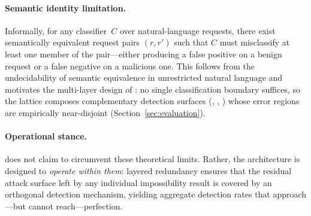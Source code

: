 \paragraph{Semantic identity limitation.}
Informally, for any classifier~$C$ over natural-language requests, there
exist semantically equivalent request pairs $(r, r')$ such that $C$ must
misclassify at least one member of the pair---either producing a false
positive on a benign request or a false negative on a malicious one.  This
follows from the undecidability of semantic equivalence in unrestricted
natural language and motivates the multi-layer design of \sentinel{}: no
single classification boundary suffices, so the lattice composes
complementary detection surfaces (\pasr{}, \mire{}, \tsa{}) whose error
regions are empirically near-disjoint (Section~\ref{sec:evaluation}).

\paragraph{Operational stance.}
\sentinel{} does not claim to circumvent these theoretical limits.  Rather,
the architecture is designed to \emph{operate within them}: layered
redundancy ensures that the residual attack surface left by any individual
impossibility result is covered by an orthogonal detection mechanism,
yielding aggregate detection rates that approach---but cannot
reach---perfection.
